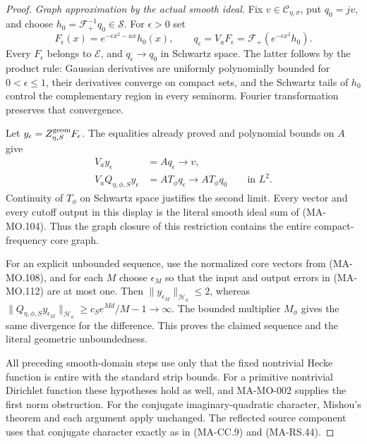 \begin{proof}
\emph{Graph approximation by the actual smooth ideal.}
Fix \(v\in\mathscr C_{\eta,\sigma}\), put \(q_0=jv\),
and choose \(h_0=\mathcal F_+^{-1}q_0\in\mathscr S\).
For \(\epsilon>0\) set
\[
 F_\epsilon(x)=e^{-\epsilon x^2-ax}h_0(x),\qquad
 q_\epsilon=V_aF_\epsilon
             =\mathcal F_+(e^{-\epsilon x^2}h_0).
 \tag{MA-MO.111}
\]
Every \(F_\epsilon\) belongs to \(\mathcal E\), and
\(q_\epsilon\to q_0\) in Schwartz space. The latter
follows by the product rule: Gaussian derivatives are
uniformly polynomially bounded for \(0<\epsilon\le1\),
their derivatives converge on compact sets, and the
Schwartz tails of \(h_0\) control the complementary
region in every seminorm. Fourier transformation
preserves that convergence.

Let \(y_\epsilon=Z_{\eta,S}^{\rm geom}F_\epsilon\).
The equalities already proved and polynomial bounds
on \(A\) give
\[
 \begin{aligned}
 V_ay_\epsilon&=Aq_\epsilon\longrightarrow v,\\
 V_aQ_{\eta,\phi,S}y_\epsilon
       &=AT_\phi q_\epsilon
                    \longrightarrow AT_\phi q_0
                         \qquad\text{in }L^2.
 \end{aligned}
 \tag{MA-MO.112}
\]
Continuity of \(T_\phi\) on Schwartz space justifies
the second limit. Every vector and every cutoff output
in this display is the literal smooth ideal sum of
(MA-MO.104). Thus the graph closure of this restriction
contains the entire compact-frequency core graph.

For an explicit unbounded sequence, use the normalized
core vectors from (MA-MO.108), and for each \(M\) choose
\(\epsilon_M\) so that the input and output errors in
(MA-MO.112) are at most one. Then
\(\|y_{\epsilon_M}\|_{\mathcal H_a}\le2\), whereas
\(\|Q_{\eta,\phi,S}y_{\epsilon_M}\|_{\mathcal H_a}
\ge c_S e^{Md}/M-1\to\infty\).
The bounded multiplier \(M_\phi\) gives the same
divergence for the difference. This proves the claimed
sequence and the literal geometric unboundedness.

All preceding smooth-domain steps use only that the
fixed nontrivial Hecke function is entire with the
standard strip bounds. For a primitive nontrivial
Dirichlet function these hypotheses hold as well,
and MA-MO-002 supplies the first norm obstruction.
For the conjugate imaginary-quadratic character,
Mishou's theorem and each argument apply unchanged.
The reflected source component uses that conjugate
character exactly as in (MA-CC.9) and (MA-RS.44).
\end{proof}

